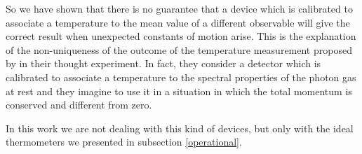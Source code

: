 \documentclass[twocolumn,usenatbib]{mnras2}
\begin{document}
So we have shown that there is no guarantee that a device which is calibrated to associate a temperature to the mean value of a different observable will give the correct result when unexpected constants of motion arise. This is the explanation of the non-uniqueness of the outcome of the temperature measurement proposed by \cite{Landsberg_1996} in their thought experiment. In fact, they consider a detector which is calibrated to associate a temperature to the spectral properties of the photon gas at rest and they imagine to use it in a situation in which the total momentum is conserved and different from zero.  

In this work we are not dealing with this kind of devices, but only with the ideal thermometers we presented in subsection \ref{operational}. 


%
%
%
\end{document}
